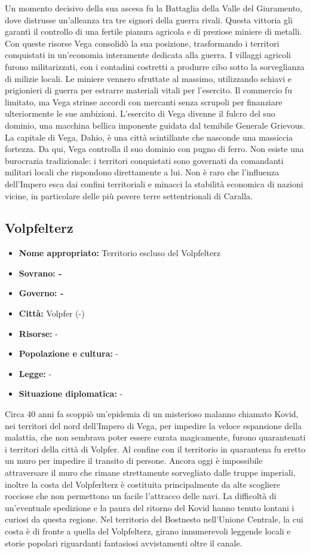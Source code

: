 \documentclass[a4paper]{report}
\begin{document}
\begin{multicols}{2}
Un momento decisivo della sua ascesa fu la Battaglia della Valle del Giuramento, dove distrusse un’alleanza tra tre signori della guerra rivali. Questa vittoria gli garantì il controllo di una fertile pianura agricola e di preziose miniere di metalli. Con queste risorse Vega consolidò la sua posizione, trasformando i territori conquistati in un'economia interamente dedicata alla guerra. I villaggi agricoli furono militarizzati, con i contadini costretti a produrre cibo sotto la sorveglianza di milizie locali. Le miniere vennero sfruttate al massimo, utilizzando schiavi e prigionieri di guerra per estrarre materiali vitali per l’esercito. Il commercio fu limitato, ma Vega strinse accordi con mercanti senza scrupoli per finanziare ulteriormente le sue ambizioni.
L’esercito di Vega divenne il fulcro del suo dominio, una macchina bellica imponente guidata dal temibile Generale Grievous.
La capitale di Vega, Dahio, è una città scintillante che nasconde una massiccia fortezza. Da qui, Vega controlla il suo dominio con pugno di ferro. Non esiste una burocrazia tradizionale: i territori conquistati sono governati da comandanti militari locali che rispondono direttamente a lui. Non è raro che l'influenza dell'Impero esca dai confini territoriali e minacci la stabilità economica di nazioni vicine, in particolare delle più povere terre settentrionali di Caralla.

\subsection*{Volpfelterz}
\begin{itemize}
	\item \textbf{Nome appropriato:} Territorio escluso del Volpfelterz
	\item \textbf{Sovrano: -} 
	\item \textbf{Governo: -} 
	\item \textbf{Città:}  Volpfer (-)
	\item \textbf{Risorse:} -
	\item \textbf{Popolazione e cultura:} -
	\item \textbf{Legge:} -
	\item \textbf{Situazione diplomatica:} - 
\end{itemize}
Circa 40 anni fa scoppiò un'epidemia di un misterioso malanno chiamato Kovid, nei territori del nord dell'Impero di Vega, per impedire la veloce espansione della malattia, che non sembrava poter essere curata magicamente, furono quarantenati i territori della città di Volpfer. Al confine con il territorio in quarantena fu eretto un muro per impedire il transito di persone. Ancora oggi è impossibile attraversare il muro che rimane strettamente sorvegliato dalle truppe imperiali, inoltre la costa del Volpferlterz è costituita principalmente da alte scogliere rocciose che non permettono un facile l'attracco delle navi. La difficoltà di un'eventuale spedizione e la paura del ritorno del Kovid hanno tenuto lontani i curiosi da questa regione. Nel territorio del Bostnesto nell'Unione Centrale, la cui costa è di fronte a quella del Volpfelterz, girano innumerevoli leggende locali e storie popolari riguardanti fantasiosi avvistamenti oltre il canale. 


\end{multicols}
\end{document}
